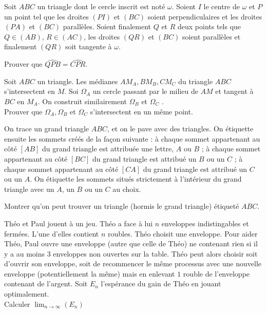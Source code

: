 \begin{exo}{}
Soit $ABC$ un triangle dont le cercle inscrit est noté $ \omega$. Soient $I$ le centre de $ \omega$ et $P$ un point tel que les droites $(PI)$ et $(BC)$ soient perpendiculaires et les droites $(PA)$ et $(BC)$ parallèles. Soient finalement $Q$ et $R$ deux points tels que $Q \in (AB)$, $R \in (AC)$, les droites $(QR)$ et $(BC)$ soient parallèles et finalement $(QR)$ soit tangente à $ \omega$.

Prouver que $ \widehat {QPB}= \widehat {CPR}$.
\end{exo}

\begin{exo}{}
Soit $ABC$ un triangle. Les médianes $AM_A,BM_B,CM_C$ du triangle $ABC$ s'intersectent en $M$. Soi  $\Omega_A$ un cercle passant par le milieu de $AM$ et tangent à $BC$ en $M_A$. On construit similairement  $\Omega_B$ et $\Omega_C$ . \\Prouver que $\Omega_A,\Omega_B$ et $\Omega_C$ s'intersectent en un même point.

\end{exo}


\begin{exo}{}
On trace un grand triangle $ABC$, et on le pave avec des triangles. On
étiquette ensuite les sommets créés de la façon suivante : à chaque
sommet appartenant au côté $[AB]$ du grand triangle est attribuée
une lettre, $A$ ou $B$ ; à chaque sommet appartenant au côté $[BC]$
du grand triangle est attribué un $B$ ou un $C$ ; à chaque sommet
appartenant au côté $[CA]$ du grand triangle est attribué un $C$ ou un $A$.
On étiquette les sommets situés strictement à l'intérieur du grand triangle
avec un $A$, un $B$ ou un $C$ au choix.

Montrer qu'on peut trouver un triangle (hormis le grand triangle) étiqueté $ABC$.
 \end{exo}


\begin{exo}{}
Théo et Paul jouent à un jeu. Théo a face à lui $n$ enveloppes indistingables et fermées. L'une d'elles contient $n$ roubles. Théo choisit une enveloppe. Pour aider Théo, Paul ouvre une enveloppe (autre que celle de Théo) ne contenant rien si il y a au moins $3$ enveloppes non ouvertes sur la table. Théo peut alors choisir soit d'ouvrir son enveloppe, soit de recommencer le même processus avec une nouvelle enveloppe (potentiellement la même) mais en enlevant $1$ rouble de l'enveloppe contenant de l'argent. Soit $E_n$ l'espérance du gain de Théo en jouant optimalement. \\
Calculer $\lim_{n\to \infty}(E_n)$
\end{exo}

